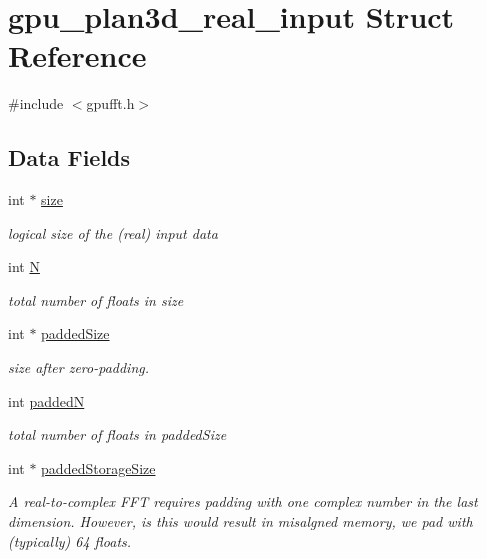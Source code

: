 \hypertarget{structgpu__plan3d__real__input}{
\section{gpu\_\-plan3d\_\-real\_\-input Struct Reference}
\label{structgpu__plan3d__real__input}
}


{\ttfamily \#include $<$gpufft.h$>$}

\subsection*{Data Fields}
\begin{DoxyCompactItemize}
\item 
int $\ast$ \hyperlink{structgpu__plan3d__real__input_a49f751412da8ff594dd2f0275a4d8a21}{size}
\begin{DoxyCompactList}\small\item\em logical size of the (real) input data \item\end{DoxyCompactList}\item 
int \hyperlink{structgpu__plan3d__real__input_a0d093b066f8063cc183c8340790bdf14}{N}
\begin{DoxyCompactList}\small\item\em total number of floats in size \item\end{DoxyCompactList}\item 
int $\ast$ \hyperlink{structgpu__plan3d__real__input_a3542f2b6fca17ea54549c784570dcd44}{paddedSize}
\begin{DoxyCompactList}\small\item\em size after zero-\/padding. \item\end{DoxyCompactList}\item 
int \hyperlink{structgpu__plan3d__real__input_a94d7eac29ab42754d7fdba51c563f419}{paddedN}
\begin{DoxyCompactList}\small\item\em total number of floats in paddedSize \item\end{DoxyCompactList}\item 
int $\ast$ \hyperlink{structgpu__plan3d__real__input_a46e1d58faf582ea23c2e3e14640356b2}{paddedStorageSize}
\begin{DoxyCompactList}\small\item\em A real-\/to-\/complex FFT requires padding with one complex number in the last dimension. However, is this would result in misalgned memory, we pad with (typically) 64 floats. \item\end{DoxyCompactList}\item 

\end{DoxyCompactItemize}
